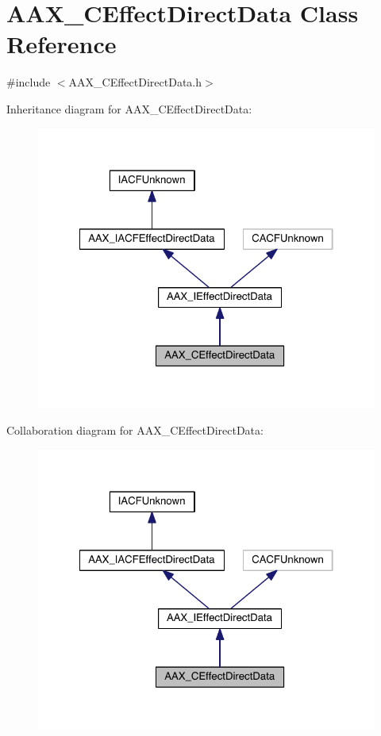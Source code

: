 \hypertarget{a00016}{}\section{A\+A\+X\+\_\+\+C\+Effect\+Direct\+Data Class Reference}
\label{a00016}


{\ttfamily \#include $<$A\+A\+X\+\_\+\+C\+Effect\+Direct\+Data.\+h$>$}



Inheritance diagram for A\+A\+X\+\_\+\+C\+Effect\+Direct\+Data\+:
\nopagebreak
\begin{figure}[H]
\begin{center}
\leavevmode
\includegraphics[width=322pt]{a00411}
\end{center}
\end{figure}


Collaboration diagram for A\+A\+X\+\_\+\+C\+Effect\+Direct\+Data\+:
\nopagebreak
\begin{figure}[H]
\begin{center}
\leavevmode
\includegraphics[width=322pt]{a00412}
\end{center}
\end{figure}


